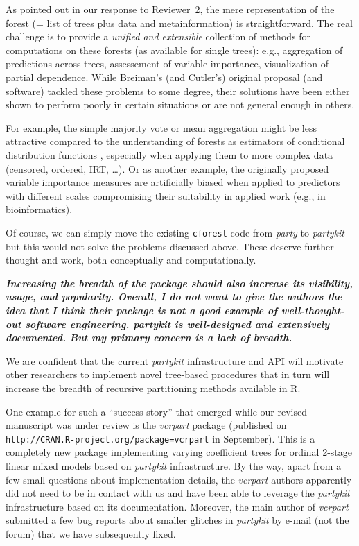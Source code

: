 \documentclass{article}
\begin{document}
\smallskip

As pointed out in our response to Reviewer~2, the mere representation of the
forest (= list of trees plus data and metainformation) is straightforward.
The real challenge is to provide a \emph{unified and extensible} collection of methods
for computations on these forests (as available for single trees): e.g.,
aggregation of predictions across trees, assessement of variable importance,
visualization of partial dependence. While Breiman's (and Cutler's) original
proposal (and software) tackled these problems to some degree, their solutions
have been either shown to perform poorly in certain situations or are not
general enough in others.

For example, the simple majority vote or mean aggregation
might be less attractive compared to the understanding of forests as
estimators of conditional distribution functions \citep{Meinshausen:2006},
especially when applying them to more complex data (censored, ordered, IRT, \dots).
Or as another example, the originally proposed variable importance measures are
artificially biased when applied to predictors with different scales
\citep{Strobl+Boulesteix+Kneib:2008} compromising their suitability in applied
work (e.g., in bioinformatics).

Of course, we can simply move the existing \texttt{cforest} code from \emph{party}
to \emph{partykit} but this would not solve the problems discussed above. These
deserve further thought and work, both conceptually and computationally.

\smallskip

\textbf{\textit{%
Increasing the breadth of the package should also increase its visibility, usage, and popularity.
Overall, I do not want to give the authors the idea that I think their
package is not a good example of well-thought-out software engineering. 
partykit is well-designed and extensively documented.  But my primary
concern is a lack of breadth.
}}

\smallskip

We are confident that the current \emph{partykit} infrastructure and API
will motivate other researchers to implement novel tree-based procedures that
in turn will increase the breadth of recursive partitioning methods available
in \textsf{R}. 

One example for such a ``success story'' that emerged while our revised manuscript was under review
is the \emph{vcrpart} package (published on \texttt{http://CRAN.R-project.org/package=vcrpart}
in September).
This is a completely new package implementing varying coefficient trees for
ordinal 2-stage linear mixed models based on \emph{partykit} infrastructure.
By the way, apart from a few small questions about implementation
details, the \emph{vcrpart} authors apparently did not need to be in contact with us and have
been able to leverage the \emph{partykit} infrastructure based on its documentation.
Moreover, the main author of \emph{vcrpart} submitted a few bug reports
about smaller glitches in \emph{partykit} by e-mail (not the forum) that we have
subsequently fixed.
\end{document}
